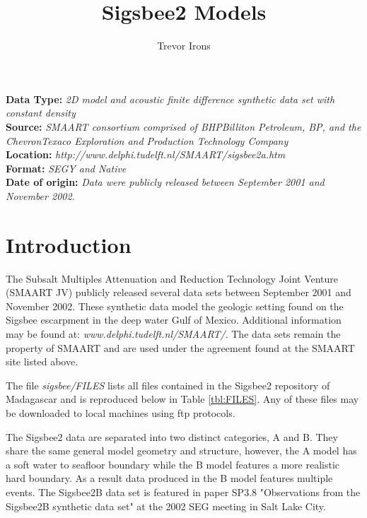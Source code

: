 \title{Sigsbee2 Models}
\author{Trevor Irons}
\maketitle

\lstset{language=python,numbers=left,numberstyle=\tiny,showstringspaces=false}

\noindent
\textbf	{Data Type:} \emph{2D model and acoustic finite difference synthetic data set with constant density}\\
\textbf	{Source:} \emph{SMAART consortium comprised of BHPBilliton Petroleum, BP, and the ChevronTexaco Exploration 
and Production Technology Company}\\
\textbf {Location:} \emph{http://www.delphi.tudelft.nl/SMAART/sigsbee2a.htm}\\
\textbf	{Format:} \emph{SEGY and Native} \\
\textbf{Date of origin:} \emph{Data were publicly released between September 2001 and November 2002.}\\ 

\section{Introduction}
The Subsalt Multiples Attenuation and Reduction Technology Joint Venture (SMAART JV) publicly released several data sets 
between September 2001 and November 2002.  These synthetic data model the geologic setting found on the Sigsbee escarpment 
in the deep water Gulf of Mexico.  Additional information may be found at: \emph{www.delphi.tudelft.nl/SMAART/}.  
The data sets remain the property of SMAART and are used under the agreement found at the SMAART site listed above.  

The file \emph{sigsbee/FILES} lists all files contained in the Sigsbee2 repository of Madagascar and is reproduced below in
Table \ref{tbl:FILES}.  Any of these files may be downloaded to local machines using ftp protocols.  

The Sigsbee2 data are separated into two distinct categories, A and B.  They share the same general model geometry and structure,
however, the A model has a soft water to seafloor boundary while the B model features a more realistic hard boundary.  As a result 
data produced in the B model features multiple events.  The Sigsbee2B data set is featured in paper SP3.8 "Observations from the 
Sigsbee2B synthetic data set" at the 2002 SEG meeting in Salt Lake City.  


